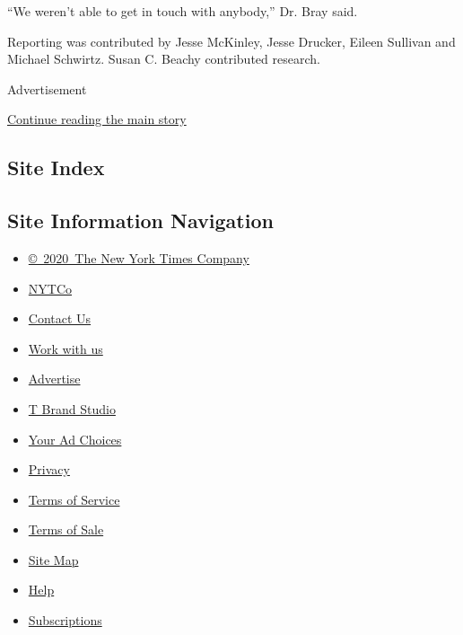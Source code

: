 ``We weren't able to get in touch with anybody,'' Dr. Bray said.

Reporting was contributed by Jesse McKinley, Jesse Drucker, Eileen
Sullivan and Michael Schwirtz. Susan C. Beachy contributed research.

Advertisement

\protect\hyperlink{after-bottom}{Continue reading the main story}

\hypertarget{site-index}{%
\subsection{Site Index}\label{site-index}}

\hypertarget{site-information-navigation}{%
\subsection{Site Information
Navigation}\label{site-information-navigation}}

\begin{itemize}
\tightlist
\item
  \href{https://help.nytimes.com/hc/en-us/articles/115014792127-Copyright-notice}{©~2020~The
  New York Times Company}
\end{itemize}

\begin{itemize}
\tightlist
\item
  \href{https://www.nytco.com/}{NYTCo}
\item
  \href{https://help.nytimes.com/hc/en-us/articles/115015385887-Contact-Us}{Contact
  Us}
\item
  \href{https://www.nytco.com/careers/}{Work with us}
\item
  \href{https://nytmediakit.com/}{Advertise}
\item
  \href{http://www.tbrandstudio.com/}{T Brand Studio}
\item
  \href{https://www.nytimes.com/privacy/cookie-policy\#how-do-i-manage-trackers}{Your
  Ad Choices}
\item
  \href{https://www.nytimes.com/privacy}{Privacy}
\item
  \href{https://help.nytimes.com/hc/en-us/articles/115014893428-Terms-of-service}{Terms
  of Service}
\item
  \href{https://help.nytimes.com/hc/en-us/articles/115014893968-Terms-of-sale}{Terms
  of Sale}
\item
  \href{https://spiderbites.nytimes.com}{Site Map}
\item
  \href{https://help.nytimes.com/hc/en-us}{Help}
\item
  \href{https://www.nytimes.com/subscription?campaignId=37WXW}{Subscriptions}
\end{itemize}
